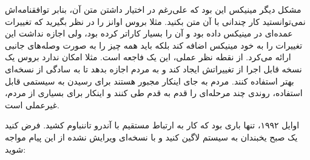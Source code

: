 مشکل دیگر مینیکس این بود که علی‌رغم در اختیار داشتن متن آن، بنابر
توافقنامه‌اش نمی‌توانستید کار چندانی با آن متن بکنید. مثلا بروس اوانز را
در نظر بگیرید که تغییرات عمده‌ای در مینیکس داده بود و آن را بسیار
کاراتر کرده بود، ولی اجازه نداشت این تغییرات را به خود مینیکس اضافه
کند بلکه باید همه چیز را به صورت وصله‌های جانبی ارائه می‌کرد. از نقطه
نظر عملی، این یک فاجعه است. مثلا امکان ندارد بروس یک نسخه قابل اجرا از
تغییراتش ایجاد کند و به مردم اجازه بدهد تا به سادگی از نسخه‌ای بهتر
استفاده کنند. مردم به جای اینکار مجبور هستند برای رسیدن به سیستمی قابل
استفاده،‌ روندی چند مرحله‌ای را قدم به قدم طی کنند و اینکار برای بسیاری
از مردم، غیرعملی است.

اوایل ۱۹۹۲، تنها باری بود که کار به ارتباط مستقیم با آندرو تاننباوم
کشید. فرض کنید یک صبح یخبندان به سیستم لاگین کنید و با نسخه‌ای ویرایش
نشده از این پیام مواجه شوید:

